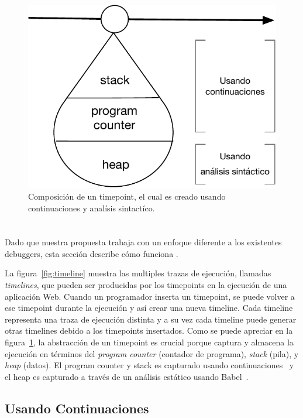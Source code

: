 \documentclass[conference]{IEEEtran}
\begin{document}
\begin{figure}[t]
\begin{center}
\includegraphics[width=.5\linewidth]{fig-timepoint}
\caption{Composici\'on de un timepoint, el cual es creado usando continuaciones y anal\'isis sintact\'ico.}
\label{fig:timepoint}
\end{center}
\end{figure}


\section{\deloreanjs}
\label{sec:deloreanjs}

Dado que nuestra propuesta trabaja con un enfoque diferente a los existentes debuggers, esta secci\'on describe c\'omo funciona \deloreanjs. 

La figura~\ref{fig:timeline} muestra las multiples trazas de ejecuci\'on, llamadas {\em timelines}, que pueden ser producidas por los timepoints en la ejecuci\'on de una aplicaci\'on Web. Cuando un programador inserta un timepoint, se puede volver a ese timepoint durante la ejecuci\'on y as\'i crear una nueva timeline. Cada timeline representa una traza de ejecuci\'on distinta y a su vez cada timeline puede generar otras timelines debido a los timepoints insertados. Como se puede apreciar en la figura~\ref{fig:timepoint}, la abstracci\'on de un timepoint es crucial porque captura y almacena la ejecuci\'on en t\'erminos del {\em program counter} (contador de programa), {\em stack} (pila), y {\em heap} (datos). El program counter y stack es capturado usando continuaciones~\cite{fw84} y el heap es capturado a trav\'es de un an\'alisis est\'atico usando Babel~\cite{mckenzie:babel}.       
  

\subsection{Usando Continuaciones}
\label{sec:continuaciones}
\end{document}
